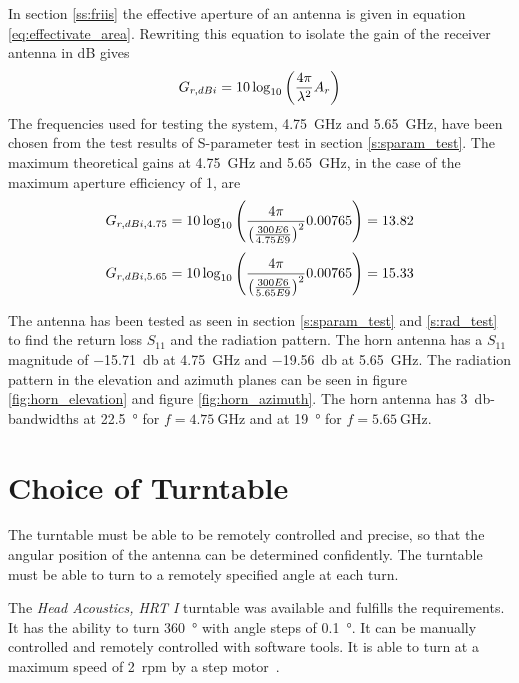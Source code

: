 In section \ref{ss:friis} the effective aperture of an antenna is given in equation \ref{eq:effectivate_area}. Rewriting this equation to isolate the gain of the receiver antenna in dB gives
\begin{equation} \label{eq:max_gain}
    G_{r,dBi} = 10 \log_{10}\left( \frac{4 \pi}{\lambda^2} A_r \right)
    \tagaddtext{[\si{\decibel}]}
\end{equation}
The frequencies used for testing the system, \SI{4.75}{\giga\hertz} and \SI{5.65}{\giga\hertz}, have been chosen from the test results of S-parameter test in section \ref{s:sparam_test}. The maximum theoretical gains at \SI{4.75}{\giga\hertz} and \SI{5.65}{\giga\hertz}, in the case of the maximum aperture efficiency of 1, are
\begin{equation} \label{eq:max_gain_475}
    G_{r,dBi,4.75} = 10 \log_{10}\left( \frac{4 \pi}{\left(\frac{300E6}{4.75E9}\right)^2} 0.00765 \right) = 13.82
    \tagaddtext{[\si{\decibel}]}
\end{equation}
\begin{equation} \label{eq:max_gain_565}
    G_{r,dBi,5.65} = 10 \log_{10}\left( \frac{4 \pi}{\left(\frac{300E6}{5.65E9}\right)^2} 0.00765 \right) = 15.33
    \tagaddtext{[\si{\decibel}]}
\end{equation}

The antenna has been tested as seen in section \ref{s:sparam_test} and \ref{s:rad_test} to find the return loss $S_{11}$ and the radiation pattern. The horn antenna has a $S_{11}$ magnitude of \SI{-15.71}{\decibel} at \SI{4.75}{\giga\hertz} and \SI{-19.56}{\decibel} at \SI{5.65}{\giga\hertz}. The radiation pattern in the elevation and azimuth planes can be seen in figure \ref{fig:horn_elevation} and figure \ref{fig:horn_azimuth}. The horn antenna has \SI{3}{\decibel}-bandwidths at \SI{22.5}{\degree} for $f=\SI{4.75}{\giga\hertz}$ and at \SI{19}{\degree} for $f=\SI{5.65}{\giga\hertz}$.


\section{Choice of Turntable}
The turntable must be able to be remotely controlled and precise, so that the angular position of the antenna can be determined confidently. The turntable must be able to turn to a remotely specified angle at each turn. 

The \textit{Head Acoustics, HRT I} turntable was available and fulfills the requirements. It has the ability to turn \SI{360}{\degree} with angle steps of \SI{0.1}{\degree}. It can be manually controlled and remotely controlled with software tools. It is able to turn at a maximum speed of \SI{2}{rpm} by a step motor~\cite{hrt_i_data_sheet}. 


